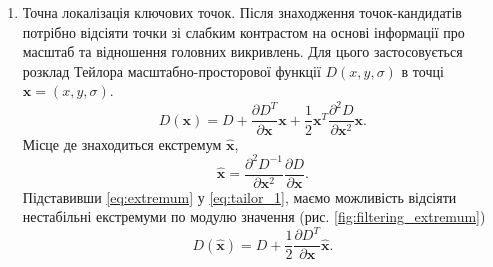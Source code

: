 \begin{enumerate}
    \item Точна локалізація ключових точок. Після знаходження точок-кандидатів потрібно
          відсіяти точки зі слабким контрастом на основі
          інформації про масштаб та відношення головних викривлень. Для цього застосовується розклад
          Тейлора масштабно-просторової функції $D(x,y,\sigma)$ в точці $\boldsymbol{x} = (x,y,\sigma)$.
          \begin{equation}
              D(\boldsymbol{x}) = D + \frac{\partial D^T }{\partial \boldsymbol{x} }\boldsymbol{x} +
              \frac{1}{2}\boldsymbol{x}^T\frac{\partial^2 D}{\partial \boldsymbol{x}^2}\boldsymbol{x}.
              \label{eq:tailor_1}
          \end{equation}
          Місце де знаходиться екстремум $\widehat{\boldsymbol{x}}$,
          \begin{equation}
              \widehat{\boldsymbol{x}} = \frac{\partial^2 D^{-1} }{\partial
                  \boldsymbol{x}^2}\frac{\partial D }{\partial \boldsymbol{x}}.
              \label{eq:extremum}
          \end{equation}
          Підставивши \eqref{eq:extremum} у \eqref{eq:tailor_1}, маємо можливість відсіяти нестабільні
          екстремуми по модулю значення (рис. \ref{fig:filtering_extremum})
          \begin{equation*}
              D(\widehat{\boldsymbol{x}}) = D + \frac{1}{2}\frac{\partial D^{T} }{\partial \boldsymbol{x}}\widehat{\boldsymbol{x}}.
          \end{equation*}


\end{enumerate}
